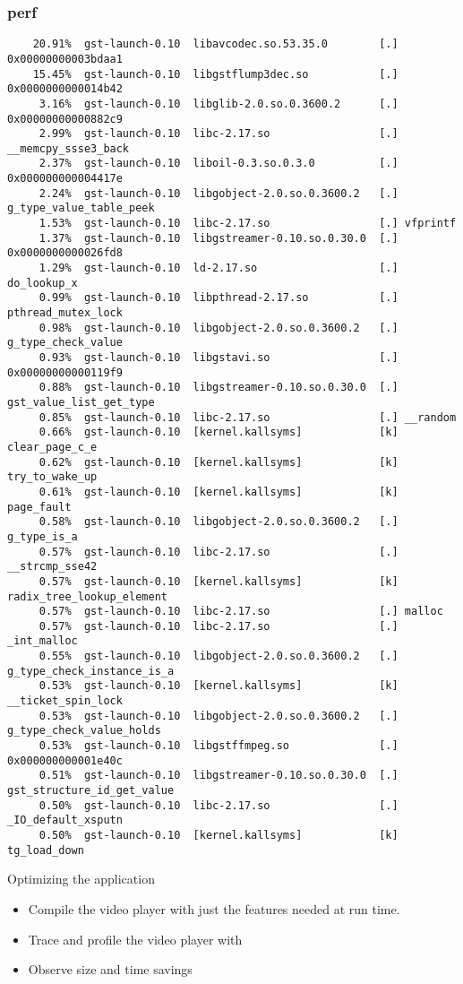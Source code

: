 \begin{frame}[fragile]
\frametitle{perf}
\begin{block}{}
\tiny
\begin{verbatim}
    20.91%  gst-launch-0.10  libavcodec.so.53.35.0        [.] 0x00000000003bdaa1
    15.45%  gst-launch-0.10  libgstflump3dec.so           [.] 0x0000000000014b42
     3.16%  gst-launch-0.10  libglib-2.0.so.0.3600.2      [.] 0x00000000000882c9
     2.99%  gst-launch-0.10  libc-2.17.so                 [.] __memcpy_ssse3_back
     2.37%  gst-launch-0.10  liboil-0.3.so.0.3.0          [.] 0x000000000004417e
     2.24%  gst-launch-0.10  libgobject-2.0.so.0.3600.2   [.] g_type_value_table_peek
     1.53%  gst-launch-0.10  libc-2.17.so                 [.] vfprintf
     1.37%  gst-launch-0.10  libgstreamer-0.10.so.0.30.0  [.] 0x0000000000026fd8
     1.29%  gst-launch-0.10  ld-2.17.so                   [.] do_lookup_x
     0.99%  gst-launch-0.10  libpthread-2.17.so           [.] pthread_mutex_lock
     0.98%  gst-launch-0.10  libgobject-2.0.so.0.3600.2   [.] g_type_check_value
     0.93%  gst-launch-0.10  libgstavi.so                 [.] 0x00000000000119f9
     0.88%  gst-launch-0.10  libgstreamer-0.10.so.0.30.0  [.] gst_value_list_get_type
     0.85%  gst-launch-0.10  libc-2.17.so                 [.] __random
     0.66%  gst-launch-0.10  [kernel.kallsyms]            [k] clear_page_c_e
     0.62%  gst-launch-0.10  [kernel.kallsyms]            [k] try_to_wake_up
     0.61%  gst-launch-0.10  [kernel.kallsyms]            [k] page_fault
     0.58%  gst-launch-0.10  libgobject-2.0.so.0.3600.2   [.] g_type_is_a
     0.57%  gst-launch-0.10  libc-2.17.so                 [.] __strcmp_sse42
     0.57%  gst-launch-0.10  [kernel.kallsyms]            [k] radix_tree_lookup_element
     0.57%  gst-launch-0.10  libc-2.17.so                 [.] malloc
     0.57%  gst-launch-0.10  libc-2.17.so                 [.] _int_malloc
     0.55%  gst-launch-0.10  libgobject-2.0.so.0.3600.2   [.] g_type_check_instance_is_a
     0.53%  gst-launch-0.10  [kernel.kallsyms]            [k] __ticket_spin_lock
     0.53%  gst-launch-0.10  libgobject-2.0.so.0.3600.2   [.] g_type_check_value_holds
     0.53%  gst-launch-0.10  libgstffmpeg.so              [.] 0x000000000001e40c
     0.51%  gst-launch-0.10  libgstreamer-0.10.so.0.30.0  [.] gst_structure_id_get_value
     0.50%  gst-launch-0.10  libc-2.17.so                 [.] _IO_default_xsputn
     0.50%  gst-launch-0.10  [kernel.kallsyms]            [k] tg_load_down
\end{verbatim}
\end{block}
\end{frame}

\setuplabframe
{Optimizing the application}
{
\begin{itemize}
\item Compile the video player with just the features needed at run
      time.
\item Trace and profile the video player with 
\item Observe size and time savings
\end{itemize}
}

